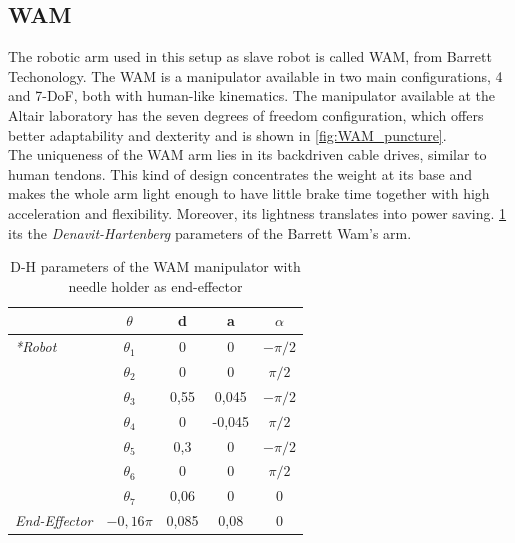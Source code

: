\subsection{WAM}
The robotic arm used in this setup as slave robot is called WAM, from Barrett Techonology.
The WAM is a manipulator available in two main configurations, 4 and 7-DoF, both with human-like kinematics.
The manipulator available at the Altair laboratory has the seven degrees of freedom configuration, which offers better adaptability and dexterity and is shown in \figurename{ \ref{fig:WAM_puncture}}.\\
The uniqueness of the WAM arm lies in its backdriven cable drives, similar to human tendons. This kind of design concentrates the weight at its base and makes the whole arm light enough to have little brake time together  with high  acceleration and flexibility. Moreover, its lightness translates into power saving.
\tablename{ \ref{WAM_DH}} its the \textit{Denavit-Hartenberg} parameters of the Barrett Wam's arm.
\begin{table} 
\centering
\begin{tabular}{>{\itshape}lcccc}
	\toprule
	&$\theta$ & d & a & $\alpha$\\
	\midrule
	\multirow{7}*{Robot}&$\theta_{1}$  & 0 & 0 & $-\pi/2$ \\
	&$\theta_{2}$  & 0	& 0 & $\pi/2$ \\
	&$\theta_{3}$  & 0,55 & 0,045 & $-\pi/2$ \\
	&$\theta_{4}$  & 0 & -0,045 & $\pi/2$\\
	&$\theta_{5}$  & 0,3 & 0 & $-\pi/2$ \\
	&$\theta_{6}$  & 0 & 0&$\pi/2$ \\
	&$\theta_{7}$  & 0,06& 0 & 0 \\
	\midrule
	End-Effector&$-0,16\pi$ & 0,085 & 0,08 & 0\\
	\bottomrule
\end{tabular}
\caption[WAM D-H parameters]{D-H parameters of the WAM manipulator with needle holder as end-effector}
\label{WAM_DH}
\end{table}

